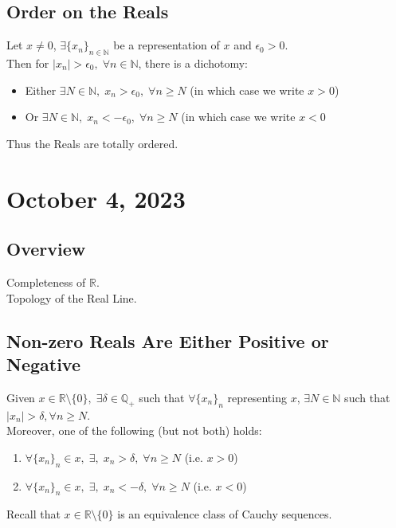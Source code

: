 \documentclass[11pt]{article}
\newcommand{\0}{\emptyset}
\newcommand{\N}{\mathbb{N}}
\newcommand{\Q}{\mathbb{Q}}
\newcommand{\R}{\mathbb{R}}
\begin{document}
\subsection*{Order on the Reals}
\label{sec:orga716b5e}
Let \(x\neq 0\), \(\exists\{x_{n}\}_{n\in\N}\) be a representation of \(x\) and \(\epsilon_{0}>0\).\\[0pt]
Then for \(|x_{n}|>\epsilon_{0},\;\forall n\in\N\), there is a dichotomy:\\[0pt]
\begin{itemize}
\item Either \(\exists N\in\N,\;x_{n}>\epsilon_{0},\;\forall n\geq N\) (in which case we write \(x>0\))\\[0pt]
\item Or \(\exists N\in\N,\;x_{n}<-\epsilon_{0},\;\forall n\geq N\) (in which case we write \(x<0\)\\[0pt]
\end{itemize}
Thus the Reals are totally ordered.\\[0pt]
\section*{October 4, 2023}
\label{sec:orgffaae31}
\subsection*{Overview}
\label{sec:org9de0c6d}
Completeness of \(\R\).\\[0pt]
Topology of the Real Line.\\[0pt]
\subsection*{Non-zero Reals Are Either Positive or Negative}
\label{sec:org598a128}
Given \(x\in\R\setminus\{0\},\;\exists\delta\in\Q_{+}\) such that \(\forall\{x_{n}\}_{n}\) representing \(x\), \(\exists N\in\N\) such that \(|x_{n}|>\delta,\forall n\geq N\).\\[0pt]
Moreover, one of the following (but not both) holds:\\[0pt]
\begin{enumerate}
\item \(\forall\{x_{n}\}_{n}\in x,\;\exists,\;x_{n}>\delta,\;\forall n\geq N\) (i.e. \(x>0\))\\[0pt]
\item \(\forall\{x_{n}\}_{n}\in x,\;\exists,\;x_{n}<-\delta,\;\forall n\geq N\) (i.e. \(x<0\))\\[0pt]
\end{enumerate}
Recall that \(x\in\R\setminus\{0\}\) is an equivalence class of Cauchy sequences.\\[0pt]
\end{document}
